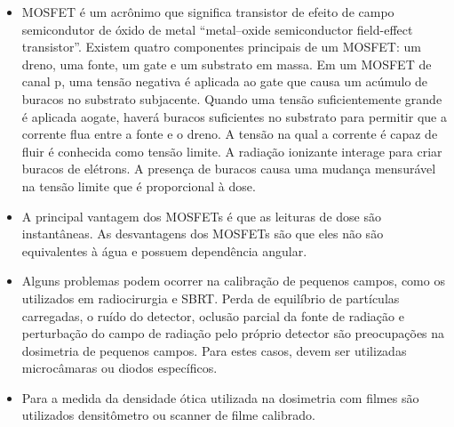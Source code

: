 \documentclass[11pt,a4paper]{article}
\newcounter{exemplo}
\begin{document}
\begin{exemplo}
\begin{itemize}
        \item MOSFET é um acrônimo que significa transistor de efeito de campo semicondutor de óxido de metal ``metal–oxide semiconductor field-effect transistor''. Existem quatro componentes principais de um MOSFET: um dreno, uma fonte, um gate e um substrato em massa. Em um MOSFET de canal p, uma tensão negativa é aplicada ao gate que causa um acúmulo de buracos no substrato subjacente. Quando uma tensão suficientemente grande é aplicada aogate, haverá buracos suficientes no substrato para permitir que a corrente flua entre a fonte e o dreno. A tensão na qual a corrente é capaz de fluir é conhecida como tensão limite. A radiação ionizante interage para criar buracos de elétrons. A presença de buracos causa uma mudança mensurável na tensão limite que é proporcional à dose.
        
        \item A principal vantagem dos MOSFETs é que as leituras de dose são instantâneas. As desvantagens dos MOSFETs são que eles não são equivalentes à água e possuem dependência angular.
        
        \item Alguns problemas podem ocorrer na calibração de pequenos campos, como os utilizados em radiocirurgia e SBRT. Perda de equilíbrio de partículas carregadas, o ruído do detector, oclusão parcial da fonte de radiação e perturbação do campo de radiação pelo próprio detector são preocupações na dosimetria de pequenos campos. Para estes casos, devem ser utilizadas microcâmaras ou diodos específicos.
        
        \item Para a medida da densidade ótica utilizada na dosimetria com filmes são utilizados densitômetro ou scanner de filme calibrado.
        
    \end{itemize}
\end{exemplo}
\end{document}
